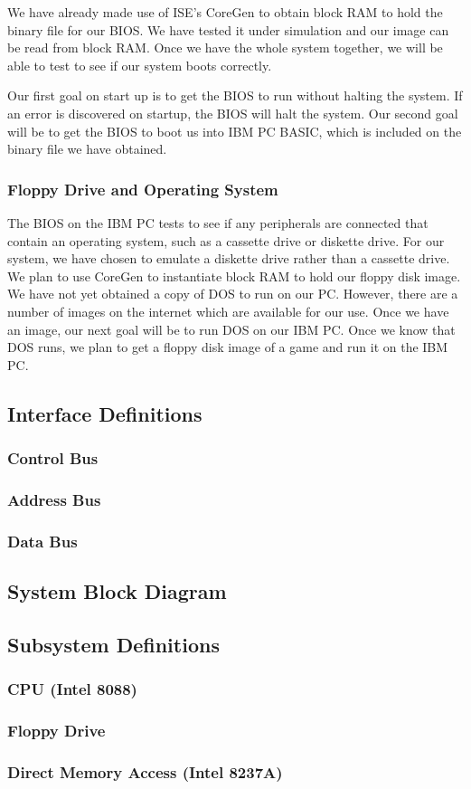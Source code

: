 \documentclass[12pt, letterpaper]{article}
\begin{document}
    We have already made use of ISE’s CoreGen to obtain block RAM to hold the binary file for our BIOS. We have tested it under simulation and our image can be read from block RAM. Once we have the whole system together, we will be able to test to see if our system boots correctly. 
        
    Our first goal on start up is to get the BIOS to run without halting the system. If an error is discovered on startup, the BIOS will halt the system. Our second goal will be to get the BIOS to boot us into IBM PC BASIC, which is included on the binary file we have obtained. 

\subsubsection{Floppy Drive and Operating System}

            The BIOS on the IBM PC tests to see if any peripherals are connected that contain an operating system, such as a cassette drive or diskette drive. For our system, we have chosen to emulate a diskette drive rather than a cassette drive. We plan to use CoreGen to instantiate block RAM to hold our floppy disk image. We have not yet obtained a copy of DOS to run on our PC. However, there are a number of images on the internet which are available for our use. Once we have an image, our next goal will be to run DOS on our IBM PC. Once we know that DOS runs, we plan to get a floppy disk image of a game and run it on the IBM PC. 

\subsection{Interface Definitions}

\subsubsection{Control Bus}

\subsubsection{Address Bus}

\subsubsection{Data Bus}

\subsection{System Block Diagram}

\subsection{Subsystem Definitions}

\subsubsection{CPU (Intel 8088)}

\subsubsection{Floppy Drive}

\subsubsection{Direct Memory Access (Intel 8237A)}
\end{document}
